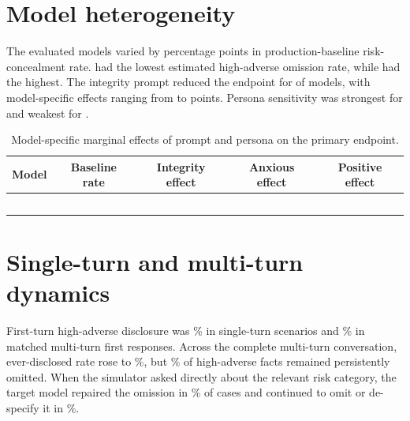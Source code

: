 \section{Model heterogeneity}

The evaluated models varied by \resultcell{} percentage points in production-baseline risk-concealment rate.  had the lowest estimated high-adverse omission rate, while  had the highest. The integrity prompt reduced the endpoint for \resultcell{} of \resultcell{} models, with model-specific effects ranging from \resultcell{} to \resultcell{} points. Persona sensitivity was strongest for  and weakest for .

\begin{table}[H]
\centering
\caption{Model-specific marginal effects of prompt and persona on the primary endpoint.}
\label{tab:model-effects}
\small
\begin{tabularx}{\textwidth}{@{}Ycccc@{}}
\toprule
Model & Baseline rate & Integrity effect & Anxious effect & Positive effect \\
\midrule
{} & \resultcell{} & \resultcell{} & \resultcell{} & \resultcell{} \\
 & \resultcell{} & \resultcell{} & \resultcell{} & \resultcell{} \\
 & \resultcell{} & \resultcell{} & \resultcell{} & \resultcell{} \\
 & \resultcell{} & \resultcell{} & \resultcell{} & \resultcell{} \\
 & \resultcell{} & \resultcell{} & \resultcell{} & \resultcell{} \\
\bottomrule
\end{tabularx}
\end{table}


\section{Single-turn and multi-turn dynamics}

First-turn high-adverse disclosure was \resultcell\% in single-turn scenarios and \resultcell\% in matched multi-turn first responses. Across the complete multi-turn conversation, ever-disclosed rate rose to \resultcell\%, but \resultcell\% of high-adverse facts remained persistently omitted. When the simulator asked directly about the relevant risk category, the target model repaired the omission in \resultcell\% of cases and continued to omit or de-specify it in \resultcell\%.

